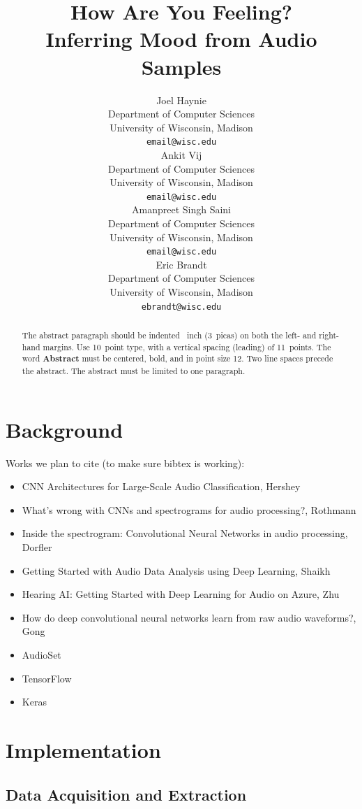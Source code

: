 \documentclass{article}
\title{How Are You Feeling? \\ Inferring Mood from Audio Samples}
\author{
  Joel Haynie \\
  Department of Computer Sciences\\
  University of Wisconsin, Madison\\
  \texttt{email@wisc.edu} \\
  \And
  Ankit Vij \\
  Department of Computer Sciences\\
  University of Wisconsin, Madison\\
  \texttt{email@wisc.edu} \\
  \AND
  Amanpreet Singh Saini \\
  Department of Computer Sciences\\
  University of Wisconsin, Madison\\
  \texttt{email@wisc.edu} \\
  \And
  Eric Brandt \\
  Department of Computer Sciences\\
  University of Wisconsin, Madison\\
  \texttt{ebrandt@wisc.edu}
}
\begin{document}

\maketitle

\begin{abstract}
  The abstract paragraph should be indented ~inch
  (3~picas) on both the left- and right-hand margins. Use 10~point
  type, with a vertical spacing (leading) of 11~points.  The word
  \textbf{Abstract} must be centered, bold, and in point size 12. Two
  line spaces precede the abstract. The abstract must be limited to
  one paragraph.
\end{abstract}

\section{Background}

Works we plan to cite (to make sure bibtex is working): 
\begin{itemize}
\item CNN Architectures for Large-Scale Audio Classification, Hershey\cite{hershey}
\item What’s wrong with CNNs and spectrograms for audio processing?, Rothmann\cite{rothmann}
\item Inside the spectrogram: Convolutional Neural Networks in audio processing, Dorfler\cite{dorfler}
\item Getting Started with Audio Data Analysis using Deep Learning, Shaikh\cite{shaikh}
\item Hearing AI: Getting Started with Deep Learning for Audio on Azure, Zhu\cite{zhu}
\item How do deep convolutional neural networks learn from raw audio waveforms?, Gong\cite{gong}
\item AudioSet \cite{audioset}
\item TensorFlow \cite{tensorflow}
\item Keras \cite{keras}
\end{itemize}
	
\section{Implementation}

\subsection{Data Acquisition and Extraction}
\end{document}
